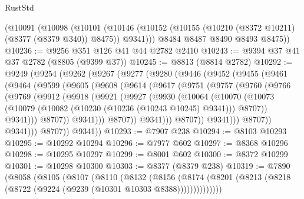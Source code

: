 \begin{lexlean}{RustStd}
\begin{coremodule}
    (@10091
      (@10098
        (@10101 (@10146 (@10152 (@10155 (@10210 (@8372 @10211) (@8377 (@8379 @340)) @8475)) @9341)))
        @8484
        @8487
        @8490
        @8493
        @8475))
@10236 := @9256 @351 @126 @41 @44 @2782 @2410
@10243 := @9394 @37 @41 @37 @2782 (@8805 (@9399 @37))
@10245 := @8813 (@8814 @2782)
@10292 := @9249
    (@9254
      (@9262
        (@9267
          (@9277
            (@9280
              (@9446
                (@9452
                  (@9455
                    (@9461
                      (@9464
                        (@9599
                          (@9605
                            (@9608
                              (@9614
                                (@9617
                                  (@9751
                                    (@9757
                                      (@9760
                                        (@9766
                                          (@9769
                                            (@9912
                                              (@9918
                                                (@9921
                                                  (@9927
                                                    (@9930
                                                      (@10064
                                                        (@10070
                                                          (@10073
                                                            (@10079
                                                              (@10082
                                                                (@10230
                                                                  (@10236 (@10243 @10245) @9341)))
                                                              @8707))
                                                          @9341)))
                                                    @8707))
                                                @9341)))
                                          @8707))
                                      @9341)))
                                @8707))
                            @9341)))
                      @8707))
                  @9341)))
            @8707))
        @9341))
@10293 := @7907 @238
@10294 := @8103 @10293
@10295 := @10292 @10294
@10296 := @7977 @602
@10297 := @8368 @10296
@10298 := @10295 @10297
@10299 := @8001 @602
@10300 := @8372 @10299
@10301 := @10298 @10300
@10303 := @8377 (@8379 @238)
@10319 := @7890
    (@8058
      (@8105
        (@8107
          (@8110
            (@8132
              (@8156
                (@8174 (@8201 (@8213 (@8218 (@8722 (@9224 (@9239 (@10301 @10303 @8388))))))))))))))

\end{coremodule}
\end{lexlean}
